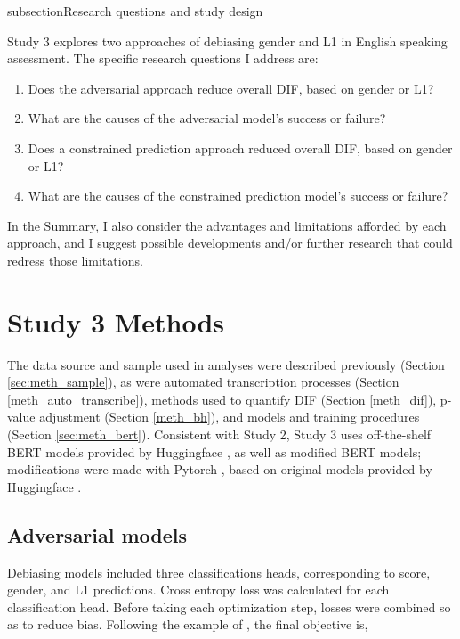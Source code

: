 \documentclass [PhD] {uclathes}
\begin{document}
subsection{Research questions and study design}

Study 3 explores two approaches of debiasing gender and L1 in English speaking assessment. The specific research questions I address are:

\begin{enumerate}
	\item Does the adversarial approach reduce overall DIF, based on gender or L1?
	\item What are the causes of the adversarial model’s success or failure?
	\item Does a constrained prediction approach reduced overall DIF, based on gender or L1?
	\item What are the causes of the constrained prediction model’s success or failure?
\end{enumerate}

In the Summary, I also consider the advantages and limitations afforded by each approach, and I suggest possible developments and/or further research that could redress those limitations. 

\section{Study 3 Methods}

The data source and sample used in analyses were described previously (Section \ref{sec:meth_sample}), as were automated transcription processes (Section \ref{meth_auto_transcribe}), methods used to quantify DIF (Section \ref{meth_dif}), p-value adjustment (Section \ref{meth_bh}), and models and training procedures (Section \ref{sec:meth_bert}). Consistent with Study 2, Study 3 uses off-the-shelf BERT models provided by Huggingface \citep{wolf_transformers_2020}, as well as modified BERT models; modifications were made with Pytorch \citep{paszke_pytorch_2019}, based on original models provided by Huggingface \citep{wolf_transformers_2020}.

\subsection{Adversarial models}

Debiasing models included three classifications heads, corresponding to score, gender, and L1 predictions. Cross entropy loss was calculated for each classification head. Before taking each optimization step, losses were combined so as to reduce bias. Following the example of \citet{wang2019balanced}, the final objective is, 
\end{document}
